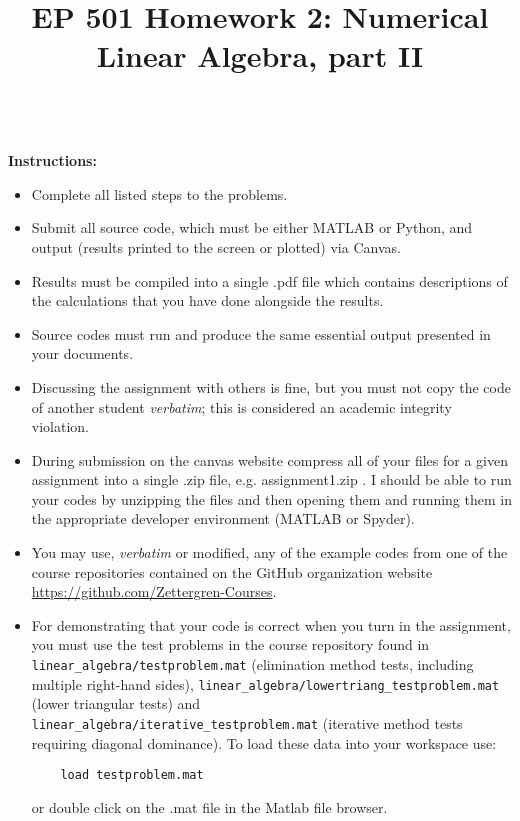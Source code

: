 \documentclass{article}
\begin{document}
\title{EP 501 Homework 2:  Numerical Linear Algebra, part II}

\maketitle

~\\
\textbf{Instructions:}  
\begin{itemize}
  \item Complete all listed steps to the problems.
  \item Submit all source code, which must be either MATLAB or Python, and output (results printed to the screen or plotted) via Canvas.  
  \item Results must be compiled into a single .pdf file which contains descriptions of the calculations that you have done alongside the results.  
  \item Source codes must run and produce the same essential output presented in your documents.  
  \item Discussing the assignment with others is fine, but you must not copy the code of another student \emph{verbatim}; this is considered an academic integrity violation.  
  \item During submission on the canvas website compress all of your files for a given assignment into a single .zip file, e.g. \textsf{assignment1.zip} .  I should be able to run your codes by unzipping the files and then opening them and running them in the appropriate developer environment (MATLAB or Spyder).  
  \item You may use, \emph{verbatim} or modified, any of the example codes from one of the course repositories contained on the GitHub organization website  \url{https://github.com/Zettergren-Courses}.
  \item For demonstrating that your code is correct when you turn in the assignment, you must use the test problems in the course repository found in \texttt{linear\_algebra/testproblem.mat} (elimination method tests, including multiple right-hand sides), \texttt{linear\_algebra/lowertriang\_testproblem.mat} (lower triangular tests) and \\ \texttt{linear\_algebra/iterative\_testproblem.mat} (iterative method tests requiring diagonal dominance).  To load these data into your workspace use:
    \begin{verbatim}
    load testproblem.mat
    \end{verbatim}
    or double click on the .mat file in the Matlab file browser.  
\end{itemize}
\end{document}
